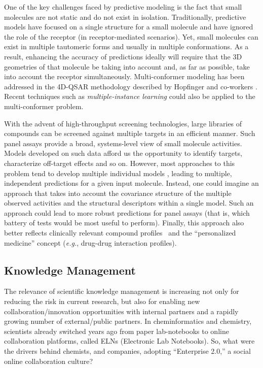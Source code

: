 \documentclass{sig-alternate}
\begin{document}
One of the key challenges faced by predictive modeling is the fact
that small molecules are not static and do not exist in
isolation. Traditionally, predictive models have focused on a single
structure for a small molecule and have ignored the role of the
receptor (in receptor-mediated scenarios). Yet, small molecules can
exist in multiple tautomeric forms and usually in multiple
conformations. As a result, enhancing the accuracy of predictions
ideally will require that the 3D geometries of that molecule be taking into account and, as
far as possible, take into account the receptor
simultaneously. Multi-conformer modeling has been addressed in the
4D-QSAR methodology described by Hopfinger and co-workers
\cite{Albuquerque:1998ys}.  Recent techniques such as
\emph{multiple-instance learning} could also be applied to the
multi-conformer problem.

With the advent of high-throughput screening technologies, large
libraries of compounds can be screened against multiple targets in an
efficient manner. Such panel assays provide a broad, systems-level
view of small molecule activities.  Models developed on such data
afford us the opportunity to identify targets, characterize off-target
effects and so on. However, most approaches to this problem tend to
develop multiple individual models \cite{Chen:2010zr}, leading to
multiple, independent predictions for a given input molecule.
Instead, one could imagine an approach that takes into account the
covariance structure of the multiple observed activities and the
structural descriptors within a single model. Such an approach could
lead to more robust predictions for panel assays (that is, which battery of tests would be most useful to perform). Finally, this
approach also better reflects clinically relevant compound
profiles~\cite{kuhn2010} and the ``personalized medicine'' concept
(\emph{e.g.}, drug-drug interaction profiles).

\subsection{Knowledge Management}
\label{sec:knowledge-management}

The relevance of scientific knowledge management is increasing not
only for reducing the risk in current research, but also for enabling
new collaboration/innovation opportunities with internal partners and
a rapidly growing number of external/public partners. In
cheminformatics and chemistry, scientists already switched years
ago from paper lab-notebooks to online collaboration platforms, called
ELNs (Electronic Lab Notebooks). So, what were the drivers behind
chemists, and companies, adopting ``Enterprise 2.0,'' a social online
collaboration culture?
\end{document}
